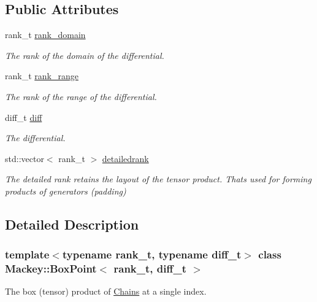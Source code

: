 \subsection*{Public Attributes}
\begin{DoxyCompactItemize}
\item 
rank\+\_\+t \hyperlink{classMackey_1_1BoxPoint_a160dd950c1ffbed689d650f4d0fadbec}{rank\+\_\+domain}
\begin{DoxyCompactList}\small\item\em The rank of the domain of the differential. \end{DoxyCompactList}\item 
rank\+\_\+t \hyperlink{classMackey_1_1BoxPoint_ab24bd5a38df100f88c8637d71dbdf608}{rank\+\_\+range}
\begin{DoxyCompactList}\small\item\em The rank of the range of the differential. \end{DoxyCompactList}\item 
diff\+\_\+t \hyperlink{classMackey_1_1BoxPoint_affefee2b62f4168ed778d96dc219ef6f}{diff}
\begin{DoxyCompactList}\small\item\em The differential. \end{DoxyCompactList}\item 
std\+::vector$<$ rank\+\_\+t $>$ \hyperlink{classMackey_1_1BoxPoint_a5a8fb888221c014f19fe2f9a8d4b2fa3}{detailedrank}
\begin{DoxyCompactList}\small\item\em The detailed rank retains the layout of the tensor product. That\textquotesingle{}s used for forming products of generators (padding) \end{DoxyCompactList}\end{DoxyCompactItemize}


\subsection{Detailed Description}
\subsubsection*{template$<$typename rank\+\_\+t, typename diff\+\_\+t$>$\newline
class Mackey\+::\+Box\+Point$<$ rank\+\_\+t, diff\+\_\+t $>$}

The box (tensor) product of \hyperlink{classMackey_1_1Chains}{Chains} at a single index. 

